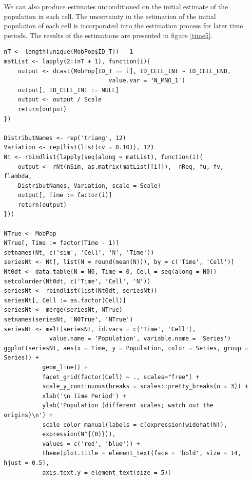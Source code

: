 \documentclass[12pt, a4paper]{article}
\begin{document}
We can also produce estimates unconditioned on the initial estimate of the population in each cell. 
The uncertainty in the estimation of the initial population of each cell is incorporated into the estimation 
process for later time periods. The results of the estimations are presented in figure \ref{time5}.
 
\begin{verbatim}
nT <- length(unique(MobPop$ID_T)) - 1
matList <- lapply(2:(nT + 1), function(i){
    output <- dcast(MobPop[ID_T == i], ID_CELL_INI ~ ID_CELL_END, 
                              value.var = 'N_MNO_1')
    output[, ID_CELL_INI := NULL]
    output <- output / Scale
    return(output)
})

DistributNames <- rep('triang', 12)
Variation <- rep(list(list(cv = 0.10)), 12)
Nt <- rbindlist(lapply(seq(along = matList), function(i){
    output <- rNt(nSim, as.matrix(matList[[i]]),  nReg, fu, fv, flambda, 
    DistributNames, Variation, scale = Scale)
    output[, Time := factor(i)]
    return(output)
}))

NTrue <- MobPop
NTrue[, Time := factor(Time - 1)]
setnames(Nt, c('sim', 'Cell', 'N', 'Time'))
seriesNt <- Nt[, list(N = round(mean(N))), by = c('Time', 'Cell')]
Nt0dt <- data.table(N = N0, Time = 0, Cell = seq(along = N0))
setcolorder(Nt0dt, c('Time', 'Cell', 'N'))
seriesNt <- rbindlist(list(Nt0dt, seriesNt))
seriesNt[, Cell := as.factor(Cell)]
seriesNt <- merge(seriesNt, NTrue)
setnames(seriesNt, 'N0True', 'NTrue')
seriesNt <- melt(seriesNt, id.vars = c('Time', 'Cell'), 
             value.name = 'Population', variable.name = 'Series')
ggplot(seriesNt, aes(x = Time, y = Population, color = Series, group = Series)) + 
           geom_line() + 
           facet_grid(factor(Cell) ~ ., scales="free") +
           scale_y_continuous(breaks = scales::pretty_breaks(n = 3)) +
           xlab('\n Time Period') + 
           ylab('Population (different scales; watch out the origins)\n') +
           scale_color_manual(labels = c(expression(widehat(N)), 
           expression(N^{(0)})), 
           values = c('red', 'blue')) +
           theme(plot.title = element_text(face = 'bold', size = 14, hjust = 0.5), 
           axis.text.y = element_text(size = 5))
\end{verbatim}
\end{document}

